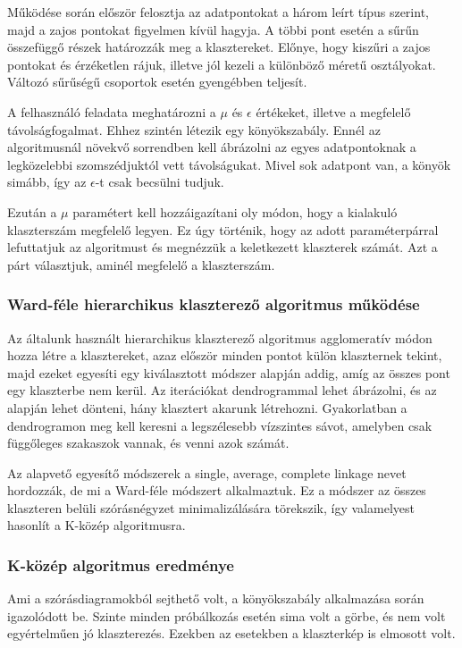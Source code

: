 \documentclass[12pt]{article}
\begin{document}
Működése során először felosztja az adatpontokat a három leírt típus szerint, majd a zajos pontokat figyelmen kívül hagyja. A többi pont esetén a sűrűn összefüggő részek határozzák meg a klasztereket. Előnye, hogy kiszűri a zajos pontokat és érzéketlen rájuk, illetve jól kezeli a különböző méretű osztályokat. Változó sűrűségű csoportok esetén gyengébben teljesít.

A felhasználó feladata meghatározni a $\mu$ és $\epsilon$ értékeket, illetve a megfelelő távolságfogalmat. Ehhez szintén létezik egy könyökszabály. Ennél az algoritmusnál növekvő sorrendben kell ábrázolni az egyes adatpontoknak a legközelebbi szomszédjuktól vett távolságukat. Mivel sok adatpont van, a könyök simább, így az $\epsilon$-t csak becsülni tudjuk. 

Ezután a $\mu$ paramétert kell hozzáigazítani oly módon, hogy a kialakuló klaszterszám megfelelő legyen. Ez úgy történik, hogy az adott paraméterpárral lefuttatjuk az algoritmust és megnézzük a keletkezett klaszterek számát. Azt a párt választjuk, aminél megfelelő a klaszterszám.

\subsubsection{Ward-féle hierarchikus klaszterező algoritmus működése}

Az általunk használt hierarchikus klaszterező algoritmus agglomeratív módon hozza létre a klasztereket, azaz először minden pontot külön klaszternek tekint, majd ezeket egyesíti egy kiválasztott módszer alapján addig, amíg az összes pont egy klaszterbe nem kerül. Az iterációkat dendrogrammal lehet ábrázolni, és az alapján lehet dönteni, hány klasztert akarunk létrehozni. Gyakorlatban a dendrogramon meg kell keresni a legszélesebb vízszintes sávot, amelyben csak függőleges szakaszok vannak, és venni azok számát.

Az alapvető egyesítő módszerek a single, average, complete linkage nevet hordozzák, de mi a Ward-féle módszert alkalmaztuk. Ez a módszer az összes klaszteren belüli szórásnégyzet minimalizálására törekszik, így valamelyest hasonlít a K-közép algoritmusra.

\subsubsection{K-közép algoritmus eredménye}
Ami a szórásdiagramokból sejthető volt, a könyökszabály alkalmazása során igazolódott be. Szinte minden próbálkozás esetén sima volt a görbe, és nem volt egyértelműen jó klaszterezés. Ezekben az esetekben a klaszterkép is elmosott volt.
\end{document}
